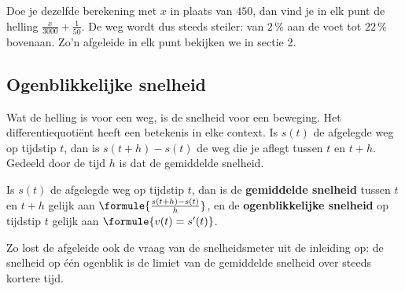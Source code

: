 Doe je dezelfde berekening met $x$ in plaats van $450$, dan vind je in elk punt de helling $\frac{x}{3000} + \frac{1}{50}$. De weg wordt dus steeds steiler: van $2\,\%$ aan de voet tot $22\,\%$ bovenaan. Zo'n afgeleide in elk punt bekijken we in sectie 2.

\subsection{Ogenblikkelijke snelheid}

Wat de helling is voor een weg, is de snelheid voor een beweging. Het differentiequotiënt heeft een betekenis in elke context. Is $s(t)$ de afgelegde weg op tijdstip $t$, dan is $s(t + h) - s(t)$ de weg die je aflegt tussen $t$ en $t + h$. Gedeeld door de tijd $h$ is dat de gemiddelde snelheid.

\begin{theorie}
Is $s(t)$ de afgelegde weg op tijdstip $t$, dan is de \textbf{\textcolor{accent}{gemiddelde snelheid}} tussen $t$ en $t + h$ gelijk aan $\formule{\frac{s(t + h) - s(t)}{h}}$, en de \textbf{\textcolor{accent}{ogenblikkelijke snelheid}} op tijdstip $t$ gelijk aan $\formule{v(t) = s'(t)}$.
\end{theorie}

Zo lost de afgeleide ook de vraag van de snelheidsmeter uit de inleiding op: de snelheid op één ogenblik is de limiet van de gemiddelde snelheid over steeds kortere tijd.


